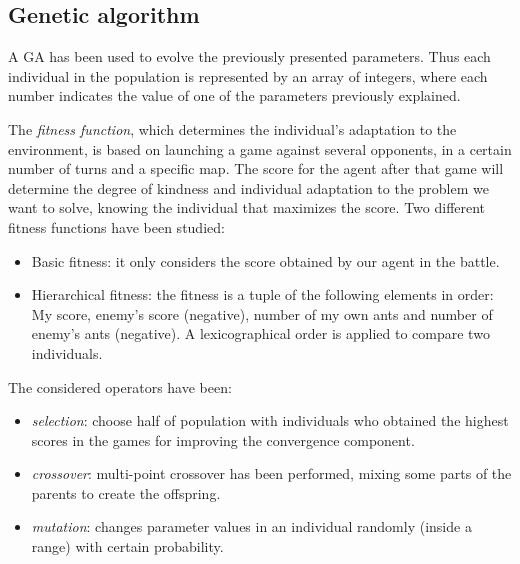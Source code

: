 \documentclass[runningheads]{llncs}
\begin{document}
\subsection{Genetic algorithm}
A GA has been used to evolve the previously presented parameters. 
Thus each individual in the population is represented by an array of integers, where each number indicates the value of one of the parameters previously explained.

The \textit{fitness function}, which determines the individual's adaptation to the environment, is based on launching a game against several opponents, in a certain number of turns and a specific map.
The score for the agent after that game will determine the degree of kindness and individual adaptation to the problem we want to solve, knowing the individual that maximizes the score. Two different fitness functions have been studied:

\begin{itemize}
\item Basic fitness: it only considers the score obtained by our agent in the battle.
\item Hierarchical fitness: the fitness is a tuple of the following elements in order: My score, enemy's score (negative), number of my own ants and number of enemy's ants (negative). A lexicographical order is applied to compare two individuals.
\end{itemize}

The considered operators have been:
\begin{itemize}
\item \textit{selection}: choose half of population with individuals who obtained the highest scores in the games for improving the convergence component.
\item \textit{crossover}: multi-point crossover has been performed, mixing some parts of the parents to create the offspring.
\item \textit{mutation}: changes parameter values in an individual randomly (inside a range) with certain probability.
\end{itemize}

\end{document}
